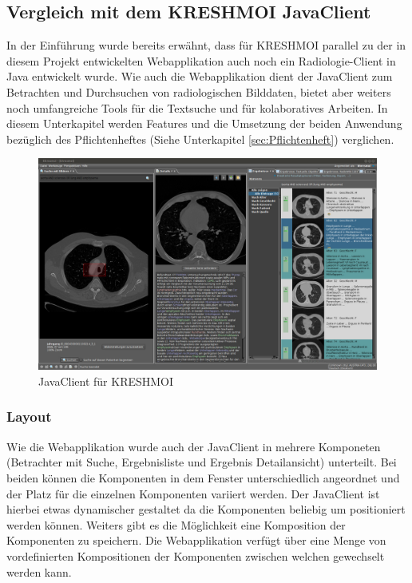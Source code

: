 \subsection{Vergleich mit dem KRESHMOI JavaClient}
\label{sec:Usability}
In der Einführung wurde bereits erwähnt, 
dass für KRESHMOI parallel zu der in diesem Projekt entwickelten Webapplikation auch noch ein Radiologie-Client in Java entwickelt wurde.
Wie auch die Webapplikation dient der JavaClient zum Betrachten und Durchsuchen von radiologischen Bilddaten,
bietet aber weiters noch umfangreiche Tools für die Textsuche und für kolaboratives Arbeiten.
In diesem Unterkapitel werden Features und die Umsetzung der beiden Anwendung bezüglich des Pflichtenheftes (Siehe Unterkapitel \ref{sec:Pflichtenheft}) verglichen.

\begin{figure}[pt]
	\centering
	\includegraphics[width=\linewidth]{img/c4_java_client.jpg}
	\caption{JavaClient für KRESHMOI}
	\label{fig:java_client}
\end{figure}

\subsubsection{Layout}
\label{sec:ua_Layout}
Wie die Webapplikation wurde auch der JavaClient in mehrere Komponeten (Betrachter mit Suche, Ergebnisliste und Ergebnis Detailansicht) unterteilt.
Bei beiden können die Komponenten in dem Fenster unterschiedlich angeordnet und der Platz für die einzelnen Komponenten variiert werden.
Der JavaClient ist hierbei etwas dynamischer gestaltet da die Komponenten beliebig um positioniert werden können.
Weiters gibt es die Möglichkeit eine Komposition der Komponenten zu speichern.
Die Webapplikation verfügt über eine Menge von vordefinierten Kompositionen der Komponenten zwischen welchen gewechselt werden kann.

